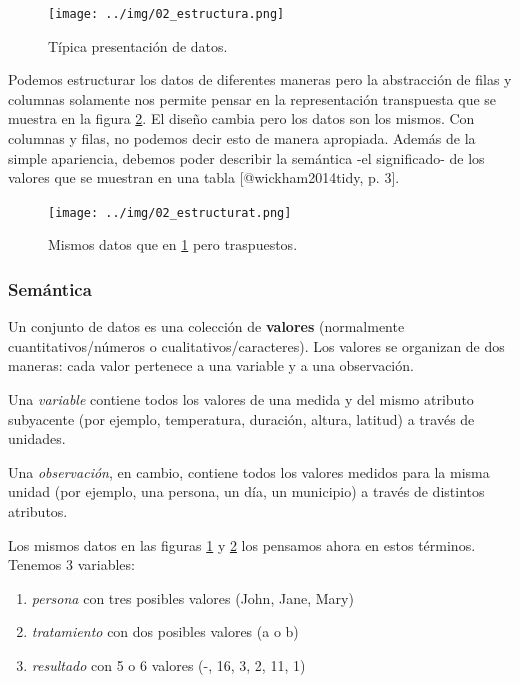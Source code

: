 \documentclass[]{article}
\providecommand{\tightlist}{%
  \setlength{\itemsep}{0pt}\setlength{\parskip}{0pt}}
\begin{document}
\begin{figure}[h]
    \centering
    \texttt{[image: ../img/02\_estructura.png]}
    \caption{Típica presentación de datos.}
    \label{fig:estructura}
\end{figure}

Podemos estructurar los datos de diferentes maneras pero la abstracción
de filas y columnas solamente nos permite pensar en la representación
transpuesta que se muestra en la figura \ref{fig:estructurat}. El diseño
cambia pero los datos son los mismos. Con columnas y filas, no podemos
decir esto de manera apropiada. Además de la simple apariencia, debemos
poder describir la semántica -el significado- de los valores que se
muestran en una tabla {[}@wickham2014tidy, p. 3{]}.

\begin{figure}[h]
    \centering
    \texttt{[image: ../img/02\_estructurat.png]}
    \caption{Mismos datos que en \ref{fig:estructura} pero traspuestos.}
    \label{fig:estructurat}
\end{figure}

\subsubsection{Semántica}\label{semantica}

Un conjunto de datos es una colección de \textbf{valores} (normalmente
cuantitativos/números o cualitativos/caracteres). Los valores se
organizan de dos maneras: cada valor pertenece a una variable y a una
observación.

Una \emph{variable} contiene todos los valores de una medida y del mismo
atributo subyacente (por ejemplo, temperatura, duración, altura,
latitud) a través de unidades.

Una \emph{observación}, en cambio, contiene todos los valores medidos
para la misma unidad (por ejemplo, una persona, un día, un municipio) a
través de distintos atributos.

Los mismos datos en las figuras \ref{fig:estructura} y
\ref{fig:estructurat} los pensamos ahora en estos términos. Tenemos 3
variables:

\begin{enumerate}
\def\labelenumi{\arabic{enumi}.}
\tightlist
\item
  \emph{persona} con tres posibles valores (John, Jane, Mary)
\item
  \emph{tratamiento} con dos posibles valores (a o b)
\item
  \emph{resultado} con 5 o 6 valores (-, 16, 3, 2, 11, 1)
\end{enumerate}
\end{document}
